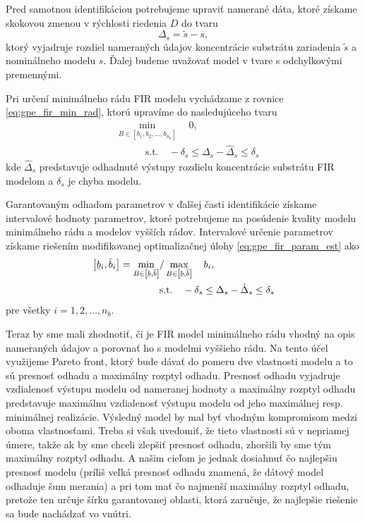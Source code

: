 Pred samotnou identifikáciou potrebujeme upraviť namerané dáta, ktoré získame skokovou zmenou v rýchlosti riedenia $ D $ do tvaru 
\begin{equation}
	\Delta_{s} = \tilde{s} - s,
\end{equation} 
ktorý vyjadruje rozdiel nameraných údajov koncentrácie substrátu zariadenia $ \tilde{s} $ a nominálneho modelu $ s $. Ďalej budeme uvažovať model v tvare s odchylkovými premennými.

Pri určení minimálneho rádu FIR modelu vychádzame z rovnice \eqref{eq:gpe_fir_min_rad}, ktorú upravíme do nasledujúceho tvaru
\begin{equation}
	\begin{split}
		& \min_{B \in \left[ b_{1}, b_{2}, \dots, b_{n_b} \right]} \quad 0, \\
		& \qquad \quad \text{s.t.} \quad -\delta_{s} \leq \Delta_{s} - \hat{\Delta}_{s} \leq \delta_{s}
		\end{split}
	\label{eq:fir_min_rad_sub}
\end{equation} 
kde $ \hat{\Delta}_{s} $ predstavuje odhadnuté výstupy rozdielu koncentrácie substrátu FIR modelom a $ \delta_{s} $ je chyba modelu.

Garantovaným odhadom parametrov v ďalšej časti identifikácie získame intervalové hodnoty parametrov, ktoré potrebujeme na posúdenie kvality modelu minimálneho rádu a modelov vyšších rádov. Intervalové určenie parametrov získame riešením modifikovanej optimalizačnej úlohy \eqref{eq:gpe_fir_param_est} ako 
\begin{equation}
	\begin{split}
		\left[ \ubar{b}_i, \bar{b}_i \right] = \min_{B \in \left[ \ubar{b}, \bar{b} \right]} &/ \max_{B \in \left[ \ubar{b}, \bar{b} \right]} \quad b_i,\\
		& \text{s.t.} \quad  -\delta_{s} \leq \Delta_{s} - \hat{\Delta}_{s} \leq \delta_{s}
	\end{split}
\label{eq:fir_param_est_sub}
\end{equation}
pre všetky $ i = 1, 2, \dots, n_b $.

Teraz by sme mali zhodnotiť, či je FIR model minimálneho rádu vhodný na opis nameraných údajov a porovnať ho s modelmi vyššieho rádu. Na tento účel využijeme Pareto front, ktorý bude dávať do pomeru dve vlastnosti modelu a to sú presnosť odhadu a maximálny rozptyl odhadu. Presnosť odhadu vyjadruje vzdialenosť výstupu modelu od nameranej hodnoty a maximálny rozptyl odhadu predstavuje maximálnu vzdialenosť výstupu modelu od jeho maximálnej resp. minimálnej realizácie. Výsledný model by mal byť vhodným kompromisom medzi oboma vlastnosťami. Treba si však uvedomiť, že tieto vlastnosti sú v nepriamej úmere, takže ak by sme chceli zlepšiť presnosť odhadu, zhoršili by sme tým maximálny rozptyl odhadu. A našim cieľom je jednak dosiahnuť čo najlepšiu presnosť modelu (príliš veľká presnosť odhadu znamená, že dátový model odhaduje šum merania) a pri tom mať čo najmenší maximálny rozptyl odhadu, pretože ten určuje šírku garantovanej oblasti, ktorá zaručuje, že najlepšie riešenie sa bude nachádzať vo vnútri.

